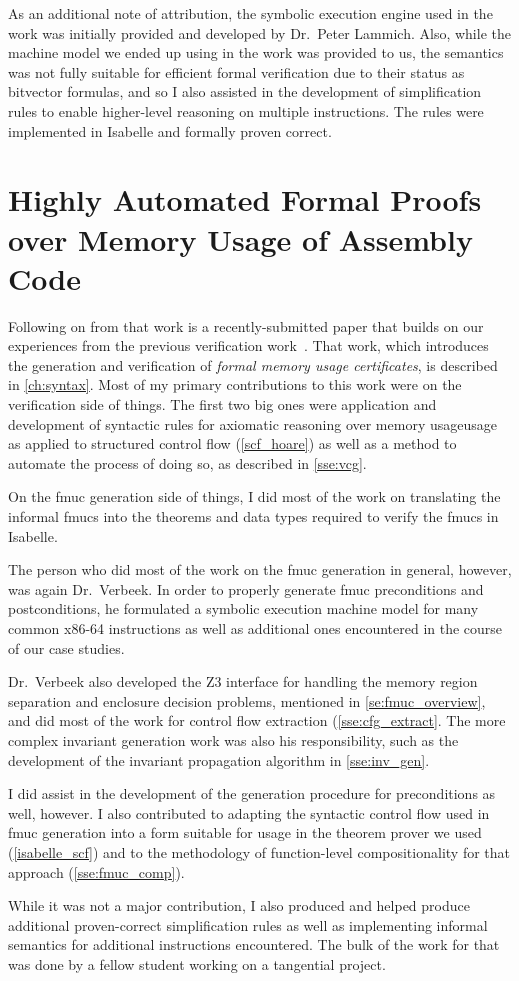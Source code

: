 As an additional note of attribution, the symbolic execution engine
used in the work was initially provided and developed by Dr.~Peter Lammich.
Also, while the machine model we ended up using in the work was provided to us,
the semantics was not fully suitable for efficient formal verification
due to their status as bitvector formulas,
and so I also assisted in the development of simplification rules
to enable higher-level reasoning on multiple instructions.
The rules were implemented in Isabelle and formally proven correct.

\section*{Highly Automated Formal Proofs
  over Memory Usage of Assembly Code}\label{attribute2}
Following on from that work is a recently-submitted paper
that builds on our experiences from the previous verification
work~\citep{popl2019underreview}. That work,
which introduces the generation and verification of
\emph{formal memory usage certificates}, is described in \cref{ch:syntax}.
Most of my primary contributions to this work were on the verification side of things.
The first two big ones were application and development of syntactic rules
for axiomatic reasoning over memory usageusage
as applied to structured control flow (\cref{scf_hoare})
as well as a method to automate the process of doing so, 
as described in \cref{sse:vcg}.

On the \ac{fmuc} generation side of things,
I did most of the work on translating the informal \acp{fmuc}
into the theorems and data types required to verify the \acp{fmuc} in Isabelle.

The person who did most of the work on the \ac{fmuc} generation in general,
however, was again Dr.~Verbeek.
In order to properly generate \ac{fmuc} preconditions and postconditions,
he formulated a symbolic execution machine model for many common x86-64 instructions
as well as additional ones encountered in the course of our case studies.

Dr.~Verbeek also developed the Z3 interface
for handling the memory region separation and enclosure decision problems,
mentioned in \cref{se:fmuc_overview},
and did most of the work for control flow extraction (\cref{sse:cfg_extract}.
The more complex invariant generation work was also his responsibility,
such as the development of the invariant propagation algorithm in \cref{sse:inv_gen}.

I did assist in the development of the generation procedure for preconditions as well,
however.
I also contributed to adapting the syntactic control flow used in \ac{fmuc} generation
into a form suitable for usage in the theorem prover we used (\cref{isabelle_scf})
and to the methodology of function-level compositionality for that approach
(\cref{sse:fmuc_comp}).

While it was not a major contribution,
I also produced and helped produce additional proven-correct simplification rules
as well as implementing informal semantics for additional instructions encountered.
The bulk of the work for that was done by a fellow student
working on a tangential project.

